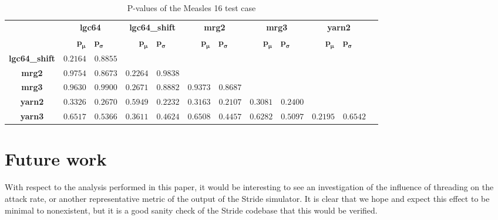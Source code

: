 \documentclass[natbib=true]{acmart}
\begin{document}
\begin{table}[!hbt]
    \begin{tabular}{c|c|c|c|c|c|c}
        & \textbf{lgc64} & \textbf{lgc64\_shift} & \textbf{mrg2} & \textbf{mrg3} & \textbf{yarn2} \\
        &  \( \bm{p_\mu} \quad \bm{p_\sigma} \)
            &  \( \bm{p_\mu} \quad \bm{p_\sigma} \)
            &  \( \bm{p_\mu} \quad \bm{p_\sigma} \)
            &  \( \bm{p_\mu} \quad \bm{p_\sigma} \)
            &  \( \bm{p_\mu} \quad \bm{p_\sigma} \) \\
        \textbf{lgc64\_shift}
            & \( 0.2164 \quad 0.8855 \)
            & \cellcolor{gray}
            & \cellcolor{gray}
            & \cellcolor{gray}
            & \cellcolor{gray} \\
        \textbf{mrg2}      
            & \( 0.9754 \quad 0.8673 \) 
            & \( 0.2264 \quad 0.9838 \) 
            & \cellcolor{gray}
            & \cellcolor{gray}
            & \cellcolor{gray} \\
        \textbf{mrg3}          
            & \( 0.9630 \quad 0.9900 \)
            & \( 0.2671 \quad 0.8882 \) 
            & \( 0.9373 \quad 0.8687 \) 
            & \cellcolor{gray}
            & \cellcolor{gray} \\
        \textbf{yarn2}        
            & \( 0.3326 \quad 0.2670 \)  
            & \( 0.5949 \quad 0.2232 \)  
            & \( 0.3163 \quad 0.2107 \) 
            & \( 0.3081 \quad 0.2400 \)  
            & \cellcolor{gray} \\
        \textbf{yarn3}          
            & \( 0.6517 \quad 0.5366 \)  
            & \( 0.3611 \quad 0.4624 \) 
            & \( 0.6508 \quad 0.4457 \)
            & \( 0.6282 \quad 0.5097 \) 
            & \( 0.2195 \quad 0.6542 \) \\
    \end{tabular}
    \caption{P-values of the Measles 16 test case}
    \label{tab:measles_16:p_values}
\end{table}

\section{Future work}

With respect to the analysis performed in this paper, it would be interesting to see an investigation of the influence of threading on the attack rate, or another representative metric of the output of the Stride simulator. It is clear that we hope and expect this effect to be minimal to nonexistent, but it is a good sanity check of the Stride codebase that this would be verified.
\end{document}
